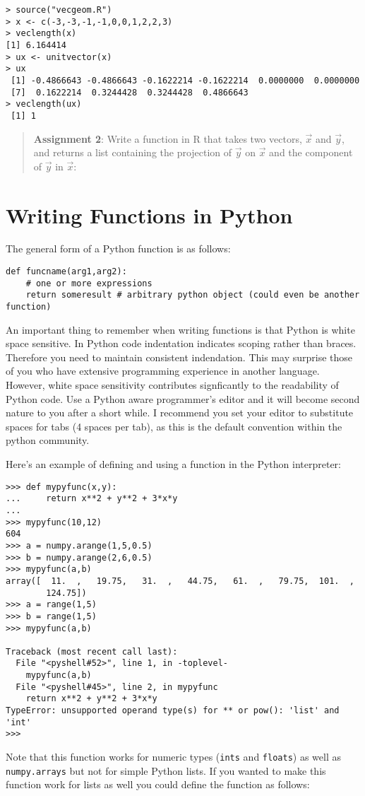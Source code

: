 \begin{lstlisting}
> source("vecgeom.R")
> x <- c(-3,-3,-1,-1,0,0,1,2,2,3)
> veclength(x)
[1] 6.164414
> ux <- unitvector(x)
> ux
 [1] -0.4866643 -0.4866643 -0.1622214 -0.1622214  0.0000000  0.0000000
 [7]  0.1622214  0.3244428  0.3244428  0.4866643
> veclength(ux)
 [1] 1
\end{lstlisting}
\begin{quote}
\textbf{Assignment 2}: Write a function in R that takes two vectors,
$\vec{x}$ and $\vec{y}$, and returns a list containing the projection of
$\vec{y}$ on $\vec{x}$ and the component of $\vec{y}$ in $\vec{x}$:


\end{quote}

\section{Writing Functions in Python}

The general form of a Python function is as follows:

\begin{lstlisting}
def funcname(arg1,arg2):
    # one or more expressions
    return someresult # arbitrary python object (could even be another function)
\end{lstlisting}
An important thing to remember when writing functions is that Python is
white space sensitive. In Python code indentation indicates scoping
rather than braces. Therefore you need to maintain consistent
indendation. This may surprise those of you who have extensive
programming experience in another language. However, white space
sensitivity contributes signficantly to the readability of Python code.
Use a Python aware programmer's editor and it will become second nature
to you after a short while. I recommend you set your editor to
substitute spaces for tabs (4 spaces per tab), as this is the default
convention within the python community.

Here's an example of defining and using a function in the Python
interpreter:

\begin{lstlisting}
>>> def mypyfunc(x,y):
...     return x**2 + y**2 + 3*x*y
... 
>>> mypyfunc(10,12)
604
>>> a = numpy.arange(1,5,0.5)
>>> b = numpy.arange(2,6,0.5)
>>> mypyfunc(a,b)
array([  11.  ,   19.75,   31.  ,   44.75,   61.  ,   79.75,  101.  ,
        124.75])
>>> a = range(1,5)
>>> b = range(1,5)
>>> mypyfunc(a,b)

Traceback (most recent call last):
  File "<pyshell#52>", line 1, in -toplevel-
    mypyfunc(a,b)
  File "<pyshell#45>", line 2, in mypyfunc
    return x**2 + y**2 + 3*x*y
TypeError: unsupported operand type(s) for ** or pow(): 'list' and 'int'
>>> 
\end{lstlisting}
Note that this function works for numeric types (\lstinline!ints! and
\lstinline!floats!) as well as \lstinline!numpy.arrays! but not for
simple Python lists. If you wanted to make this function work for lists
as well you could define the function as follows:


